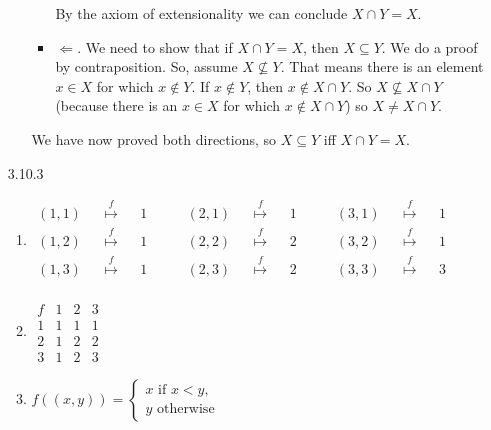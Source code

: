 \begin{itemize}
\begin{enumerate}[(a)]
\begin{itemize}
                By the axiom of extensionality we can conclude $X \cap Y = X$.

              \item $\Leftarrow$. We need to show that if $X \cap Y = X$, then $X \subseteq Y$.
                We do a proof by contraposition.
                So, assume $X \not \subseteq Y$.
                That means there is an element $x \in X$ for which $x \not \in Y$.
                If $x \not \in Y$, then $x \not \in X \cap Y$.
                So $X \not \subseteq X \cap Y$ (because there is an $x \in X$ for which $x \not \in X \cap Y$) so $X \not = X \cap Y$.

            \end{itemize}

We have now proved both directions, so $X \subseteq Y$ iff $X \cap Y = X$.

\end{enumerate}
\item[3.10.3] \
\begin{enumerate}
    \item $	\begin{matrix}
		(1,1) && \overset{f}{\mapsto} && 1 \\ 
		(1,2) && \overset{f}{\mapsto} && 1 \\ 
		(1,3) && \overset{f}{\mapsto} && 1 \\
	\end{matrix} 
	\qquad	
	\begin{matrix}
		(2,1) && \overset{f}{\mapsto} && 1 \\
		(2,2) && \overset{f}{\mapsto} && 2\\
		(2,3) && \overset{f}{\mapsto} && 2\\
	\end{matrix}
	\qquad
		\begin{matrix}
 		(3,1)&& \overset{f}{\mapsto} && 1\\
		(3,2)&& \overset{f}{\mapsto} && 1\\
		(3,3) && \overset{f}{\mapsto} && 3\\
	\end{matrix}$
	\item $\begin{array}{c|ccc}
		f & 1 & 2 & 3 \\ \hline
		1 & 1& 1& 1 \\
		2 & 1 & 2 &2 \\
		3 & 1 & 2 & 3 
	\end{array}$
	\item 	$
	f((x, y)) = 
	\begin{cases}
	x \text{ if } x < y,\\
	y \text{ otherwise}
	\end{cases}
	$
\end{enumerate}{}


\end{itemize}
